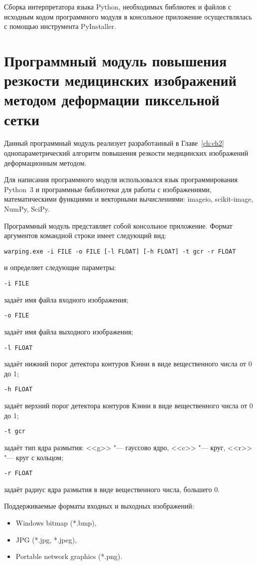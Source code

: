 Сборка интерпретатора языка Python, необходимых библиотек и файлов с исходным кодом программного модуля в консольное приложение осуществлялась с помощью инструмента PyInstaller.

\section{Программный модуль повышения резкости медицинских изображений методом деформации пиксельной сетки}

Данный программный модуль реализует разработанный в Главе~\ref{ch:ch2} однопараметрический алгоритм повышения резкости медицинских изображений деформационным методом.

Для написания программного модуля использовался язык программирования Python~3 и программные библиотеки для работы с изображениями, математическими функциями и векторными вычислениями: imageio, scikit-image, NumPy, SciPy.

Программный модуль представляет собой консольное приложение. Формат аргументов командной строки имеет следующий вид:

\texttt{warping.exe -i~FILE -o~FILE [-l~FLOAT] [-h~FLOAT] -t~g\textbar c\textbar r -r~FLOAT}

\noindent и определяет следующие параметры:

\noindent \texttt{-i~FILE}

задаёт имя файла входного изображения;

\noindent \texttt{-o~FILE}

задаёт имя файла выходного изображения;

\noindent \texttt{-l~FLOAT}

задаёт нижний порог детектора контуров Кэнни в виде вещественного числа от 0 до 1;

\noindent \texttt{-h~FLOAT}

задаёт верхний порог детектора контуров Кэнни в виде вещественного числа от 0 до 1;

\noindent \texttt{-t~g\textbar c\textbar r}

задаёт тип ядра размытия: <<g>> "--- гауссово ядро, <<c>> "--- круг, <<r>> "--- круг с кольцом;

\noindent \texttt{-r~FLOAT}

задаёт радиус ядра размытия в виде вещественного числа, большего 0.

Поддерживаемые форматы входных и выходных изображений:

\begin{itemize}[beginpenalty=10000]
	\item Windows bitmap (*.bmp),
	\item JPG (*.jpg, *.jpeg),
	\item Portable network graphics (*.png).
\end{itemize}

